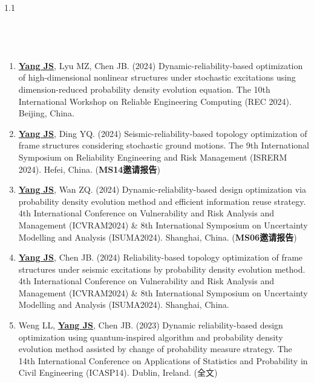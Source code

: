 \documentclass{resume}
\begin{document}
\begin{spacing}{1.1}
\subsection{\faUsers\ }
\begin{enumerate}[itemsep=5pt,topsep=2pt]
  \item \underline{\textbf{Yang JS}}, Lyu MZ, Chen JB. (2024) Dynamic-reliability-based optimization of high-dimensional nonlinear structures under stochastic excitations using dimension-reduced probability density evolution equation. The 10th International Workshop on Reliable Engineering Computing (REC 2024). Beijing, China.

  \item \underline{\textbf{Yang JS}}, Ding YQ. (2024) Seismic-reliability-based topology optimization of frame structures considering stochastic ground motions. The 9th International Symposium on Reliability Engineering and Risk Management (ISRERM 2024). Hefei, China. (\textbf{MS14邀请报告})

  \item \underline{\textbf{Yang JS}}, Wan ZQ. (2024) Dynamic-reliability-based design optimization via probability density evolution method and efficient information reuse strategy. 4th International Conference on Vulnerability and Risk Analysis and Management (ICVRAM2024) \& 8th International Symposium on Uncertainty Modelling and Analysis (ISUMA2024). Shanghai, China. (\textbf{MS06邀请报告})

  \item \underline{\textbf{Yang JS}}, Chen JB. (2024) Reliability-based topology optimization of frame structures under seismic excitations by probability density evolution method. 4th International Conference on Vulnerability and Risk Analysis and Management (ICVRAM2024) \& 8th International Symposium on Uncertainty Modelling and Analysis (ISUMA2024). Shanghai, China.

  \item Weng LL, \underline{\textbf{Yang JS}}, Chen JB. (2023) Dynamic reliability-based design optimization using quantum-inspired algorithm and probability density evolution method assisted by change of probability measure strategy. The 14th International Conference on Applications of Statistics and Probability in Civil Engineering (ICASP14). Dublin, Ireland. (全文)


\end{enumerate}
\end{spacing}
\end{document}
